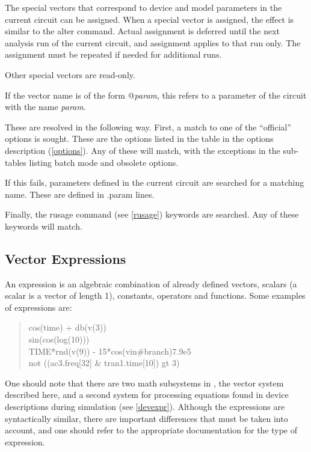 The special vectors that correspond to device and model parameters in
the current circuit can be assigned.  When a special vector is
assigned, the effect is similar to the {\cb alter} command.  Actual
assignment is deferred until the next analysis run of the current
circuit, and assignment applies to that run only.  The assignment must
be repeated if needed for additional runs.

Other special vectors are read-only.

If the vector name is of the form {\vt @}{\it param}, this refers to a
parameter of the circuit with the name {\it param}.

These are resolved in the following way.  First, a match to one of the
``official'' options is sought.  These are the options listed in the
table in the options description (\ref{options}).  Any of these will
match, with the exceptions in the sub-tables listing batch mode and
obsolete options.

If this fails, parameters defined in the current circuit are searched
for a matching name.  These are defined in {\vt .param} lines.

Finally, the {\cb rusage} command (see \ref{rusage}) keywords are
searched.  Any of these keywords will match.


\subsection{Vector Expressions}
\label{vecexpr}


An expression is an algebraic combination of already defined vectors,
scalars (a scalar is a vector of length 1), constants, operators and
functions.  Some examples of expressions are:
\begin{quote}
{\vt cos(time) + db(v(3))}\\
{\vt sin(cos(log(10)))}\\
{\vt TIME*rnd(v(9)) - 15*cos(vin\#branch)7.9e5}\\
{\vt not ((ac3.freq[32] \& tran1.time[10]) gt 3)}
\end{quote}

One should note that there are two math subsystems in {\WRspice}, the
vector system described here, and a second system for processing
equations found in device descriptions during simulation (see
\ref{devexpr}).  Although the expressions are syntactically similar,
there are important differences that must be taken into account, and
one should refer to the appropriate documentation for the type of
expression.

